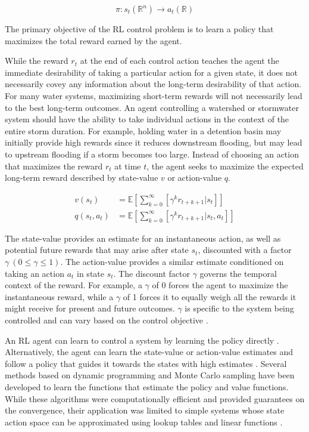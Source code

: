 \begin{equation}
    \pi :s_t (\mathbb{R}^n ) \rightarrow a_t (\mathbb{R})
\end{equation}

The primary objective of the RL control problem is to learn a policy that maximizes the total reward earned by the agent.

While the reward $r_t$ at the end of each control action teaches the agent the immediate desirability of taking a particular action for a given state, it does not necessarily covey any information about the long-term desirability of that action.
For many water systems, maximizing short-term rewards will not necessarily lead to the best long-term outcomes.
An agent controlling a watershed or stormwater system should have the ability to take individual actions in the context of the entire storm duration.
For example, holding water in a detention basin may initially provide high rewards since it reduces downstream flooding, but may lead to upstream flooding if a storm becomes too large.
Instead of choosing an action that maximizes the reward $r_t$  at time $t$, the agent seeks to maximize the expected long-term reward described by state-value $v$ or action-value $q$.

\begin{align}
	v(s_t) &= \mathbb{E} \left[\sum_{k=0}^\infty \left[\gamma^k r_{t+k+1} \Big| s_t\right] \right] \\
	q(s_t,a_t) &= \mathbb{E} \left[\sum_{k=0}^\infty \left[\gamma^k r_{t+k+1} \Big| s_t, a_t\right] \right]
\end{align}

The state-value provides an estimate for an instantaneous action, as well as potential future rewards that may arise after state $s_t$, discounted with a factor $\gamma\ (0 \leq \gamma \leq 1)$.
The action-value provides a similar estimate conditioned on taking an action $a_t$ in state $s_t$.
The discount factor $\gamma$ governs the temporal context of the reward.
For example, a $\gamma$ of 0 forces the agent to maximize the instantaneous reward, while a $\gamma$ of 1 forces it to equally weigh all the rewards it might receive for present and future outcomes.
$\gamma$ is specific to the system being controlled and can vary based on the control objective \cite{Sutton98}.

An RL agent can learn to control a system by learning the policy directly \cite{sutton2000policy}.
Alternatively, the agent can learn the state-value or action-value estimates and follow a policy that guides it towards the states with high estimates \cite{Sutton98}.
Several methods based on dynamic programming \cite{Watkins1992Q-learning, sutton1991planning} and Monte Carlo sampling \cite{Sutton98} have been developed to learn the functions that estimate the policy and value functions.
While these algorithms were computationally efficient and provided guarantees on the convergence, their application was limited to simple systems whose state action space can be approximated using lookup tables and linear functions \cite{Sutton98,Mnih2013PlayingLearning}.


